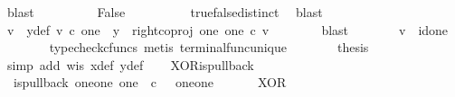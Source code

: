 \begin{isabellebody}
\ blast\isanewline
\ \ \ \ \ \ \isamarkupfalse%
\ \isamarkupfalse%
\ False\isanewline
\ \ \ \ \ \ \ \ \isamarkupfalse%
\ true{\isacharunderscore}{\kern0pt}false{\isacharunderscore}{\kern0pt}distinct\ \isamarkupfalse%
\ blast\isanewline
\ \ \ \ \isamarkupfalse%
\isanewline
\ \ \ \ \isamarkupfalse%
\ \isamarkupfalse%
\ v\ \ y{\isacharunderscore}{\kern0pt}def{\isacharcolon}{\kern0pt}\ {\isachardoublequoteopen}v\ {\isasymin}\isactrlsub c\ one\ {\isasymand}\ y\ {\isacharequal}{\kern0pt}\ right{\isacharunderscore}{\kern0pt}coproj\ one\ one\ {\isasymcirc}\isactrlsub c\ v{\isachardoublequoteclose}\isanewline
\ \ \ \ \ \ \isamarkupfalse%
\ blast\isanewline
\ \ \ \ \isamarkupfalse%
\ \isamarkupfalse%
\ {\isachardoublequoteopen}v\ {\isacharequal}{\kern0pt}\ id{\isacharparenleft}{\kern0pt}one{\isacharparenright}{\kern0pt}{\isachardoublequoteclose}\isanewline
\ \ \ \ \ \ \isamarkupfalse%
\ {\isacharparenleft}{\kern0pt}typecheck{\isacharunderscore}{\kern0pt}cfuncs{\isacharcomma}{\kern0pt}\ metis\ terminal{\isacharunderscore}{\kern0pt}func{\isacharunderscore}{\kern0pt}unique{\isacharparenright}{\kern0pt}\isanewline
\ \ \ \ \isamarkupfalse%
\ \isamarkupfalse%
\ {\isacharquery}{\kern0pt}thesis\isanewline
\ \ \ \ \ \ \isamarkupfalse%
\ {\isacharparenleft}{\kern0pt}simp\ add{\isacharcolon}{\kern0pt}\ w{\isacharunderscore}{\kern0pt}is\ x{\isacharunderscore}{\kern0pt}def\ y{\isacharunderscore}{\kern0pt}def{\isacharparenright}{\kern0pt}\isanewline
\ \ \isamarkupfalse%
\isanewline
{}\isamarkupfalse%
%
\endisatagproof
{\isafoldproof}%
%
\isadelimproof
\isanewline
%
\endisadelimproof
\isanewline
{}\isamarkupfalse%
\ XOR{\isacharunderscore}{\kern0pt}is{\isacharunderscore}{\kern0pt}pullback{\isacharcolon}{\kern0pt}\isanewline
\ \ {\isachardoublequoteopen}is{\isacharunderscore}{\kern0pt}pullback\ {\isacharparenleft}{\kern0pt}one{\isasymCoprod}one{\isacharparenright}{\kern0pt}\ one\ {\isacharparenleft}{\kern0pt}{\isasymOmega}\ {\isasymtimes}\isactrlsub c\ {\isasymOmega}{\isacharparenright}{\kern0pt}\ {\isasymOmega}\ {\isacharparenleft}{\kern0pt}{\isasymbeta}\isactrlbsub {\isacharparenleft}{\kern0pt}one{\isasymCoprod}one{\isacharparenright}{\kern0pt}\isactrlesub {\isacharparenright}{\kern0pt}\ {\isasymt}\ {\isacharparenleft}{\kern0pt}{\isasymlangle}{\isasymt}{\isacharcomma}{\kern0pt}\ {\isasymf}{\isasymrangle}\ {\isasymamalg}\ {\isasymlangle}{\isasymf}{\isacharcomma}{\kern0pt}\ {\isasymt}{\isasymrangle}{\isacharparenright}{\kern0pt}\ XOR{\isachardoublequoteclose}\isanewline

\end{isabellebody}
